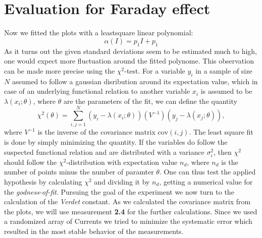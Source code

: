 \section{Evaluation for Faraday effect}
Now we fitted the plots with a leastsquare linear polynomial:
\begin{equation}
    \alpha(I) = p_1 I + p_1
\end{equation}
As it turns out the given standard deviations seem to be estimated much to high,
one would expect more fluctuation 
around the fitted polynome. This observation can be made more 
precise using the $\chi^2$-test. For a variable $y_i$ in a sample of 
size $N$ assumed to follow 
a gaussian disribution around its expectation value, which in case of 
an underlying functional relation to another variable $x_i$ is assumed 
to be $\lambda(x_i; \theta)$, where $\theta$ are the parameters of 
the fit, we can define the quantity
\begin{equation}
    \chi^2(\theta) = \sum_{i, j= 1}^N (y_i - \lambda(x_i; \theta))
        (V^{-1}) (y_j - \lambda(x_j; \theta)), 
\end{equation}
where $V^{-1}$ is the inverse of the covariance matrix $\mathrm{cov}(i,j)$. 
The least square fit is done by simply minimizing the quantity. If the 
variables do follow the suspected functional relation and are distributed 
with a variance $\sigma_i^2$, then $\chi^2$ should follow the 
$\chi^2$-distribution with expectation value $n_d$, where $n_d$ is 
the number of points minus the number of paramter $\theta$.
One can thus test the applied hypothesis by calculating $\chi^2$ and 
dividing it by $n_d$, getting a numerical value for the 
\emph{godness-of-fit}. Pursuing the goal of the experiment we now turn to the 
calculation of the \textit{Verdet} constant. As we calculated the covariance matrix from the
plots, we will use measurement \textbf{2.4} for the further calculations. Since we used
a randomized array of Currents we tried to minimize the systematic error which resulted
in the most stable behavior of the measurements.

